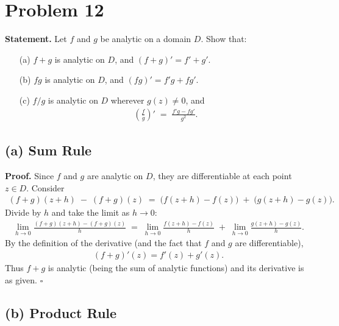 \documentclass[12pt]{article}
\theoremstyle{definition} %
\theoremstyle{plain} %
\begin{document}
\section*{Problem 12}

\textbf{Statement.} 
Let $f$ and $g$ be analytic on a domain $D$. Show that:
\begin{enumerate}
\item[(a)] $f+g$ is analytic on $D$, and $(f+g)' = f' + g'$.
\item[(b)] $fg$ is analytic on $D$, and $(fg)' = f'g + fg'$.
\item[(c)] $f/g$ is analytic on $D$ wherever $g(z)\neq 0$, and 
\begin{align}
\left(\frac{f}{g}\right)' \;=\; \frac{f'g - fg'}{g^2}.
\end{align}
\end{enumerate}

\subsection*{(a) Sum Rule}

\textbf{Proof.} 
Since $f$ and $g$ are analytic on $D$, they are differentiable at each point $z \in D$. Consider
\begin{align}
(f + g)(z + h) \;-\; (f + g)(z)
\;=\;
\bigl(f(z + h) - f(z)\bigr)
\;+\;
\bigl(g(z + h) - g(z)\bigr).
\end{align}
Divide by $h$ and take the limit as $h \to 0$:
\begin{align}
\lim_{h \to 0} \frac{(f + g)(z + h) - (f + g)(z)}{h}
\;=\;
\lim_{h \to 0} \frac{f(z + h) - f(z)}{h}
\;+\;
\lim_{h \to 0} \frac{g(z + h) - g(z)}{h}.
\end{align}
By the definition of the derivative (and the fact that $f$ and $g$ are differentiable),
\begin{align}
(f + g)'(z) = f'(z) + g'(z).
\end{align}
Thus $f+g$ is analytic (being the sum of analytic functions) and its derivative is as given. 
\quad $\square$

\subsection*{(b) Product Rule}
\end{document}
